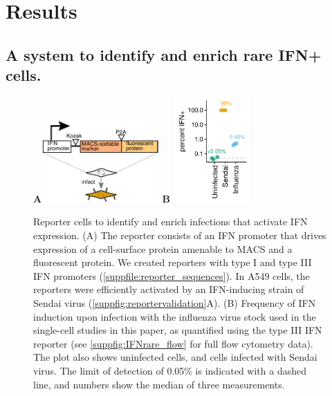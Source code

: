 \documentclass[]{asm-article}
\newcommand{\SUPPFILE}[1]{\autoref{suppfile:#1}}
\newcommand{\SUPPFIG}[1]{\autoref{suppfig:#1}}
\begin{document}
\section{Results}

\subsection{A system to identify and enrich rare IFN+ cells.}

\begin{figure}
\centerline{
{\bf \Large A}\includegraphics[width=0.4\textwidth,valign=t]{figures/IFN_stochastic/IFN_reporter/IFN_reporter.pdf}
\hspace{0.03\textwidth}
{\bf \Large B} \includegraphics[width=0.26\textwidth,valign=t]{figures/IFN_stochastic/Flow/ifn_percent.pdf}
}
\caption{
Reporter cells to identify and enrich infections that activate IFN expression.
(A) The reporter consists of an IFN promoter that drives expression of a cell-surface protein amenable to MACS and a fluorescent protein.
We created reporters with type I and type III IFN promoters (\SUPPFILE{reporter_sequences}).
In A549 cells, the reporters were efficiently activated by an IFN-inducing strain of Sendai virus (\SUPPFIG{reportervalidation}A).
(B)
Frequency of IFN induction upon infection with the influenza virus stock used in the single-cell studies in this paper, as quantified using the type III IFN reporter (see \SUPPFIG{IFNrare_flow} for full flow cytometry data).
The plot also shows uninfected cells, and cells infected with Sendai virus.
The limit of detection of 0.05\% is indicated with a dashed line, and numbers show the median of three measurements.
}
\label{fig:IFNrare}
\end{figure}
\end{document}
